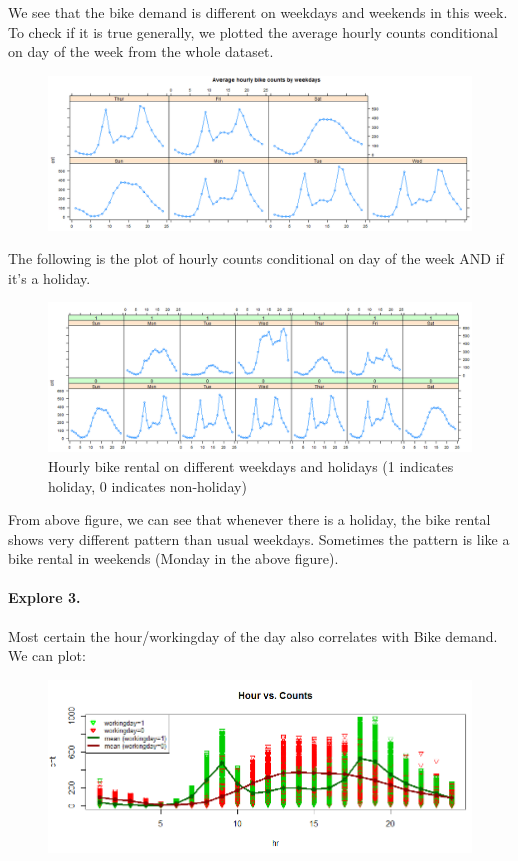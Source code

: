 \documentclass[12pt]{article}
\begin{document}
	We see that the bike demand is different on weekdays and weekends in this week. To check if it is true generally, we plotted the average hourly counts conditional on day of the week from the whole dataset.
	\begin{figure}[H]
		\centering
		\includegraphics[scale=.6]{figures/hr_weekday.png}
	\end{figure}
	
	The following is the plot of hourly counts conditional on day of the week AND if it's a holiday.
		\begin{figure}[H]
			\centering
			\includegraphics[scale=1]{figures/hr_weekday_holiday.png}
			\caption{Hourly bike rental on different weekdays and holidays (1 indicates holiday, 0 indicates non-holiday)}
		\end{figure}
	From above figure, we can see that whenever there is a holiday, the bike rental shows very different pattern than usual weekdays.  Sometimes the pattern is like a bike rental in weekends (Monday in the above figure).
	
	\paragraph*{Explore 3.} Most certain the hour/workingday of the day also correlates with Bike demand. We can plot: 
	\begin{figure}[H]
		\centering
		\includegraphics[scale=.85]{figures/hr_cnt.png}
	\end{figure}
	
\end{document}
